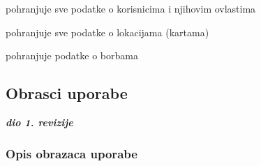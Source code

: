 \begin{packed_enum}
	\item  {}
	
	\begin{packed_enum}
		
		\item pohranjuje sve podatke o korisnicima i njihovim ovlastima
		
		\item pohranjuje sve podatke o lokacijama (kartama)
		
		\item  pohranjuje podatke o borbama
		
		
	\end{packed_enum}
\end{packed_enum}

\eject 



\subsection{Obrasci uporabe}

\textbf{\textit{dio 1. revizije}}

\subsubsection{Opis obrazaca uporabe}

